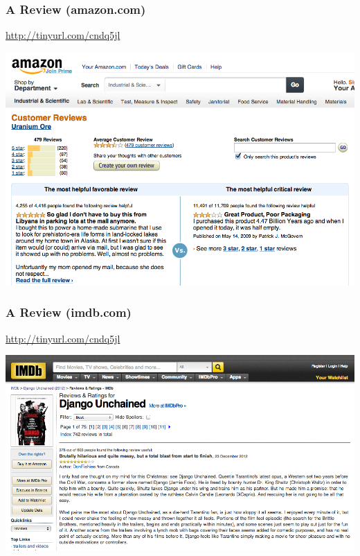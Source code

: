\documentclass[t]{beamer}
\begin{document}
\begin{frame} \frametitle{A Review (amazon.com)} %

\begin{block}{\url{http://tinyurl.com/cndq5jl}} 

\begin{center}
     \includegraphics[width=\textwidth]{amazon-review}
\end{center}

\end{block}

\end{frame} 




\begin{frame} \frametitle{A Review (imdb.com)} %

\begin{block}{\url{http://tinyurl.com/cndq5jl}} 

\begin{center}
     \includegraphics[width=\textwidth]{imdb-review}
\end{center}

\end{block}


\end{frame} 
\end{document}

